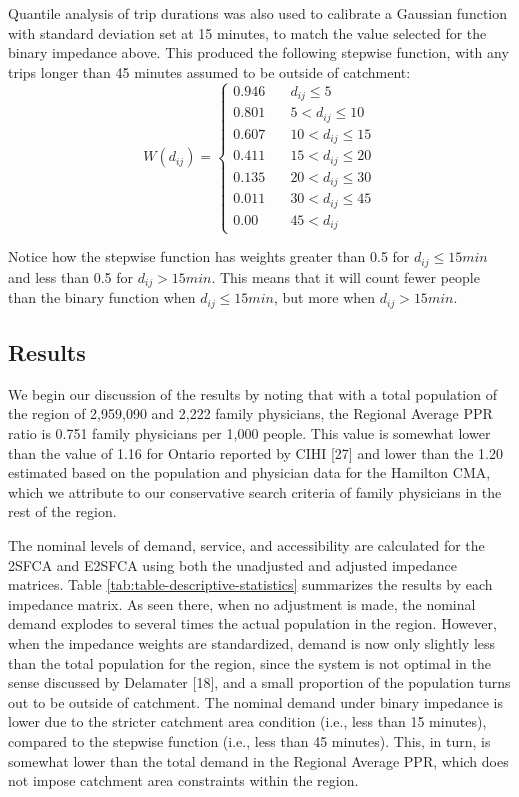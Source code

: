 \documentclass[10pt,letterpaper]{article}
\begin{document}
Quantile analysis of trip durations was also used to calibrate a
Gaussian function with standard deviation set at 15 minutes, to match
the value selected for the binary impedance above. This produced the
following stepwise function, with any trips longer than 45 minutes
assumed to be outside of catchment: \[
W(d_{ij}) = \left\{
        \begin{array}{ll}
            0.946 & \quad d_{ij} \leq 5 \\
            0.801 & \quad 5 < d_{ij} \leq 10 \\
            0.607 & \quad 10 < d_{ij} \leq 15 \\
            0.411 & \quad 15 < d_{ij} \leq 20 \\
            0.135 & \quad 20 < d_{ij} \leq 30 \\
            0.011 & \quad 30 < d_{ij} \leq 45 \\
            0.00 & \quad 45 < d_{ij}
        \end{array}
    \right.
\]

Notice how the stepwise function has weights greater than 0.5 for
\(d_{ij} \leq 15 min\) and less than 0.5 for \(d_{ij} > 15 min\). This
means that it will count fewer people than the binary function when
\(d_{ij} \leq 15 min\), but more when \(d_{ij} > 15 min\).

\subsection{Results}\label{results}

We begin our discussion of the results by noting that with a total
population of the region of 2,959,090 and 2,222 family physicians, the
Regional Average PPR ratio is 0.751 family physicians per 1,000 people.
This value is somewhat lower than the value of 1.16 for Ontario reported
by CIHI {[}27{]} and lower than the 1.20 estimated based on the
population and physician data for the Hamilton CMA, which we attribute
to our conservative search criteria of family physicians in the rest of
the region.

The nominal levels of demand, service, and accessibility are calculated
for the 2SFCA and E2SFCA using both the unadjusted and adjusted
impedance matrices. Table \ref{tab:table-descriptive-statistics}
summarizes the results by each impedance matrix. As seen there, when no
adjustment is made, the nominal demand explodes to several times the
actual population in the region. However, when the impedance weights are
standardized, demand is now only slightly less than the total population
for the region, since the system is not optimal in the sense discussed
by Delamater {[}18{]}, and a small proportion of the population turns
out to be outside of catchment. The nominal demand under binary
impedance is lower due to the stricter catchment area condition (i.e.,
less than 15 minutes), compared to the stepwise function (i.e., less
than 45 minutes). This, in turn, is somewhat lower than the total demand
in the Regional Average PPR, which does not impose catchment area
constraints within the region.
\end{document}
